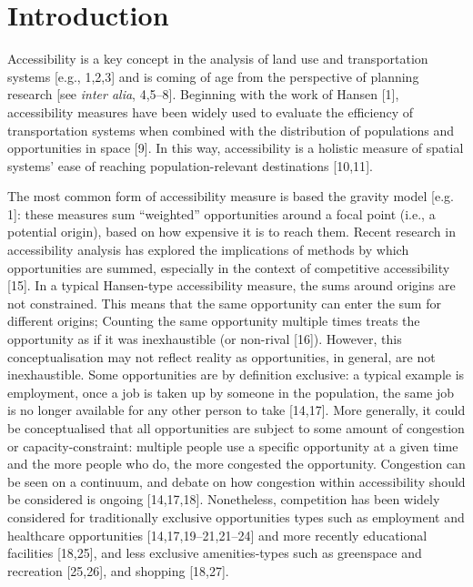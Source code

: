\documentclass[10pt,letterpaper]{article}
\begin{document}

\linenumbers

\hypertarget{introduction}{%
\section{Introduction}\label{introduction}}

Accessibility is a key concept in the analysis of land use and
transportation systems {[}e.g., 1,2,3{]} and is coming of age from the
perspective of planning research {[}see \emph{inter alia}, 4,5--8{]}.
Beginning with the work of Hansen {[}1{]}, accessibility measures have
been widely used to evaluate the efficiency of transportation systems
when combined with the distribution of populations and opportunities in
space {[}9{]}. In this way, accessibility is a holistic measure of
spatial systems' ease of reaching population-relevant destinations
{[}10,11{]}.

The most common form of accessibility measure is based the gravity model
{[}e.g. 1{]}: these measures sum ``weighted'' opportunities around a
focal point (i.e., a potential origin), based on how expensive it is to
reach them. Recent research in accessibility analysis has explored the
implications of methods by which opportunities are summed, especially in
the context of competitive accessibility {[}15{]}. In a typical
Hansen-type accessibility measure, the sums around origins are not
constrained. This means that the same opportunity can enter the sum for
different origins; Counting the same opportunity multiple times treats
the opportunity as if it was inexhaustible (or non-rival {[}16{]}).
However, this conceptualisation may not reflect reality as
opportunities, in general, are not inexhaustible. Some opportunities are
by definition exclusive: a typical example is employment, once a job is
taken up by someone in the population, the same job is no longer
available for any other person to take {[}14,17{]}. More generally, it
could be conceptualised that all opportunities are subject to some
amount of congestion or capacity-constraint: multiple people use a
specific opportunity at a given time and the more people who do, the
more congested the opportunity. Congestion can be seen on a continuum,
and debate on how congestion within accessibility should be considered
is ongoing {[}14,17,18{]}. Nonetheless, competition has been widely
considered for traditionally exclusive opportunities types such as
employment and healthcare opportunities {[}14,17,19--21,21--24{]} and
more recently educational facilities {[}18,25{]}, and less exclusive
amenities-types such as greenspace and recreation {[}25,26{]}, and
shopping {[}18,27{]}.
\end{document}
